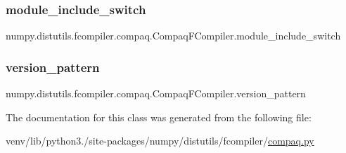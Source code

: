 \subsubsection{\texorpdfstring{module\+\_\+include\+\_\+switch}{module\_include\_switch}}
{\footnotesize\ttfamily numpy.\+distutils.\+fcompiler.\+compaq.\+Compaq\+F\+Compiler.\+module\+\_\+include\+\_\+switch\hspace{0.3cm}{\ttfamily [static]}}

\mbox{\label{classnumpy_1_1distutils_1_1fcompiler_1_1compaq_1_1CompaqFCompiler_a8b8e6384ea3c1cd3cc6e56b61dacfa65}} 
\subsubsection{\texorpdfstring{version\+\_\+pattern}{version\_pattern}}
{\footnotesize\ttfamily numpy.\+distutils.\+fcompiler.\+compaq.\+Compaq\+F\+Compiler.\+version\+\_\+pattern\hspace{0.3cm}{\ttfamily [static]}}



The documentation for this class was generated from the following file\+:\begin{DoxyCompactItemize}
\item 
venv/lib/python3./site-\/packages/numpy/distutils/fcompiler/\hyperlink{compaq_8py}{compaq.\+py}\end{DoxyCompactItemize}
